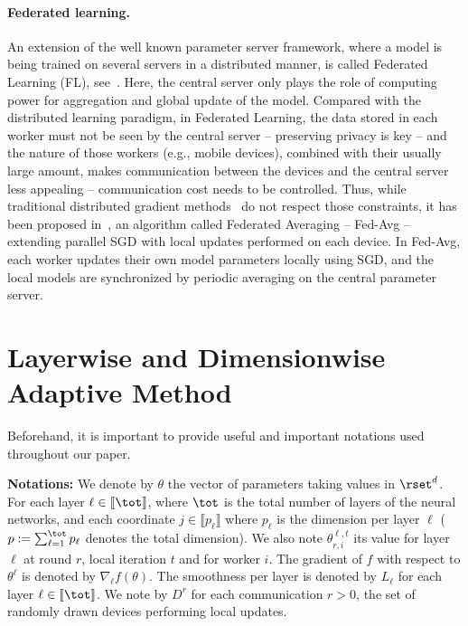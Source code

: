 \documentclass[11pt]{article}
\begin{document}
\paragraph{Federated learning.}
An extension of the well known parameter server framework, where a model is being trained on several servers in a distributed manner, is called Federated Learning (FL), see~\citep{konevcny2016federated}.
Here, the central server only plays the role of computing power for aggregation and global update of the model.
Compared with the distributed learning paradigm, in Federated Learning, the data stored in each worker must not be seen by the central server -- preserving privacy is key -- and the nature of those workers (e.g., mobile devices), combined with their usually large amount, makes communication between the devices and the central server less appealing -- communication cost needs to be controlled.
Thus, while traditional distributed gradient methods~\citep{recht2011hogwild,li2014scaling,zhao2020distributed} do not respect those constraints, it has been proposed in~\citep{mcmahan2017communication}, an algorithm called Federated Averaging -- Fed-Avg -- extending parallel SGD with local updates performed on each device. 
In Fed-Avg, each worker updates their own model parameters locally using SGD, and the local models are synchronized by periodic averaging on the central parameter server.

\vspace{-0.1in}
\section{Layerwise and Dimensionwise Adaptive Method}\label{sec:main}
Beforehand, it is important to provide useful and important notations used throughout our paper.

\vspace{0.05in}
\textbf{Notations:} We denote by $\theta$ the vector of parameters taking values in $\rset^d$. 
For each layer $\ell \in \llbracket \tot \rrbracket$, where $\tot$ is the total number of layers of the neural networks, and each coordinate $j \in \llbracket p_\ell \rrbracket$ where $p_\ell$ is the dimension per layer $\ell$ ($p := \sum_{\ell=1}^\tot p_\ell$ denotes the total dimension).
We also note $\theta_{r,i}^{\ell,t}$ its value for layer $\ell$ at round $r$, local iteration $t$ and for worker $i$.
The gradient of $f$ with respect to $\theta^\ell$ is denoted by $\nabla_{\ell} f(\theta)$.
The smoothness per layer is denoted by $L_\ell$ for each layer $\ell \in \llbracket \tot \rrbracket$.
We note by $D^{r}$ for each communication $r>0$, the set of randomly drawn devices performing local updates.
\end{document}
